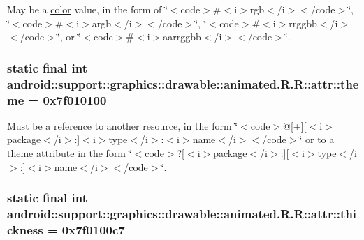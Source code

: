 May be a \hyperlink{classandroid_1_1support_1_1graphics_1_1drawable_1_1animated_1_1_r_1_1color}{color} value, in the form of \char`\"{}$<$code$>$\#$<$i$>$rgb$<$/i$>$$<$/code$>$\char`\"{}, \char`\"{}$<$code$>$\#$<$i$>$argb$<$/i$>$$<$/code$>$\char`\"{}, \char`\"{}$<$code$>$\#$<$i$>$rrggbb$<$/i$>$$<$/code$>$\char`\"{}, or \char`\"{}$<$code$>$\#$<$i$>$aarrggbb$<$/i$>$$<$/code$>$\char`\"{}. \hypertarget{classandroid_1_1support_1_1graphics_1_1drawable_1_1animated_1_1_r_1_1attr_abe544c17f1668a55ab3a571ca2e5c59}{
\subsubsection[{theme}]{\setlength{\rightskip}{0pt plus 5cm}static final int android::support::graphics::drawable::animated.R.R::attr::theme = 0x7f010100}}
\label{classandroid_1_1support_1_1graphics_1_1drawable_1_1animated_1_1_r_1_1attr_abe544c17f1668a55ab3a571ca2e5c59}


Must be a reference to another resource, in the form \char`\"{}$<$code$>$@\mbox{[}+\mbox{]}\mbox{[}$<$i$>$package$<$/i$>$:\mbox{]}$<$i$>$type$<$/i$>$:$<$i$>$name$<$/i$>$$<$/code$>$\char`\"{} or to a theme attribute in the form \char`\"{}$<$code$>$?\mbox{[}$<$i$>$package$<$/i$>$:\mbox{]}\mbox{[}$<$i$>$type$<$/i$>$:\mbox{]}$<$i$>$name$<$/i$>$$<$/code$>$\char`\"{}. \hypertarget{classandroid_1_1support_1_1graphics_1_1drawable_1_1animated_1_1_r_1_1attr_41d3ec09a6918d2afa666a70b5d12f0e}{
\subsubsection[{thickness}]{\setlength{\rightskip}{0pt plus 5cm}static final int android::support::graphics::drawable::animated.R.R::attr::thickness = 0x7f0100c7}}
\label{classandroid_1_1support_1_1graphics_1_1drawable_1_1animated_1_1_r_1_1attr_41d3ec09a6918d2afa666a70b5d12f0e}


